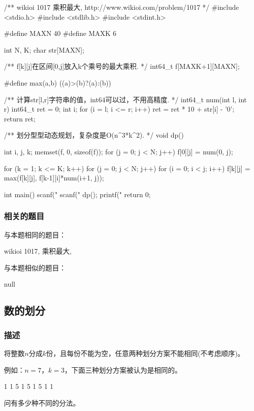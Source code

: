\begin{Codex}[label=maximal_product.c]
/** wikioi 1017 乘积最大, http://www.wikioi.com/problem/1017 */
#include <stdio.h>
#include <stdlib.h>
#include <stdint.h>

#define MAXN 40
#define MAXK 6

int N, K;
char str[MAXN];

/** f[k][j]在区间[0,j]放入k个乘号的最大乘积. */
int64_t f[MAXK+1][MAXN];


#define max(a,b) ((a)>(b)?(a):(b))

/** 计算str[l,r]字符串的值，int64可以过，不用高精度. */
int64_t num(int l, int r) {
    int64_t ret = 0;
    int i;
    for (i = l; i <= r; i++) {
        ret = ret * 10 + str[i] - '0';
    }
    return ret;
}

/** 划分型型动态规划，复杂度是O(n^3*k^2). */
void dp() {
    int i, j, k;
    memset(f, 0, sizeof(f));
    for (j = 0; j < N; j++) {
        f[0][j] = num(0, j);
    }

    for (k = 1; k <= K; k++) {
        for (j = 0; j < N; j++) {
            for (i = 0; i < j; i++) {
                f[k][j] = max(f[k][j], f[k-1][i]*num(i+1, j));
            }
        }
    }
}

int main() {
    scanf("%
    scanf("%
    dp();
    printf("%
    return 0;
}
\end{Codex}

\subsubsection{相关的题目}
与本题相同的题目：
\begindot
\item wikioi 1017, 乘积最大, 
\myenddot

与本题相似的题目：
\begindot
\item  null
\myenddot


\subsection{数的划分}

\subsubsection{描述}
将整数$n$分成$k$份，且每份不能为空，任意两种划分方案不能相同(不考虑顺序)。

例如：$n=7$，$k=3$，下面三种划分方案被认为是相同的。
\begin{Code}
1 1 5
1 5 1
5 1 1
\end{Code}
问有多少种不同的分法。

